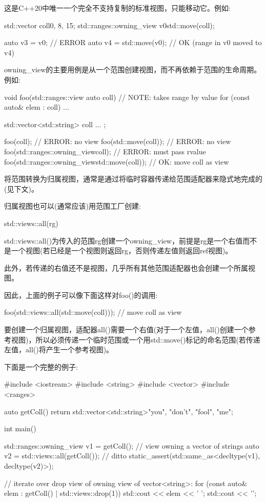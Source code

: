 这是C++20中唯一一个完全不支持复制的标准视图，只能移动它。例如:

\begin{cpp}
std::vector coll{0, 8, 15};
std::ranges::owning_view v0{std::move(coll)};

auto v3 = v0; // ERROR
auto v4 = std::move(v0); // OK (range in v0 moved to v4)
\end{cpp}

owning\_view的主要用例是从一个范围创建视图，而不再依赖于范围的生命周期。例如:

\begin{cpp}
void foo(std::ranges::view auto coll) // NOTE: takes range by value
{
	for (const auto& elem : coll) {
		...
	}
}

std::vector<std::string> coll{ ... };

foo(coll); // ERROR: no view
foo(std::move(coll)); // ERROR: no view
foo(std::ranges::owning_view{coll}); // ERROR: must pass rvalue
foo(std::ranges::owning_view{std::move(coll)}); // OK: move coll as view
\end{cpp}

将范围转换为归属视图，通常是通过将临时容器传递给范围适配器来隐式地完成的(见下文)。


归属视图也可以(通常应该)用范围工厂创建:

\begin{cpp}
std::views::all(rg)
\end{cpp}

std::views::all()为传入的范围rg创建一个owning\_view，前提是rg是一个右值而不是一个视图(若已经是一个视图则返回rg，否则传递左值则返回ref视图)。

此外，若传递的右值还不是视图，几乎所有其他范围适配器也会创建一个所属视图。

因此，上面的例子可以像下面这样对foo()的调用:

\begin{cpp}
foo(std::views::all(std::move(coll))); // move coll as view
\end{cpp}

要创建一个归属视图，适配器all()需要一个右值(对于一个左值，all()创建一个参考视图)，所以必须传递一个临时范围或一个用std::move()标记的命名范围(若传递左值，all()将产生一个参考视图)。

下面是一个完整的例子:


\begin{cpp}
#include <iostream>
#include <string>
#include <vector>
#include <ranges>

auto getColl()
{
	return std::vector<std::string>{"you", "don't", "fool", "me"};
}

int main()
{
	std::ranges::owning_view v1 = getColl(); // view owning a vector of strings
	auto v2 = std::views::all(getColl()); // ditto
	static_assert(std::same_as<decltype(v1), decltype(v2)>);
	
	// iterate over drop view of owning view of vector<string>:
	for (const auto& elem : getColl() | std::views::drop(1)) {
		std::cout << elem << ' ';
	}
	std::cout << '\n';
}
\end{cpp}

